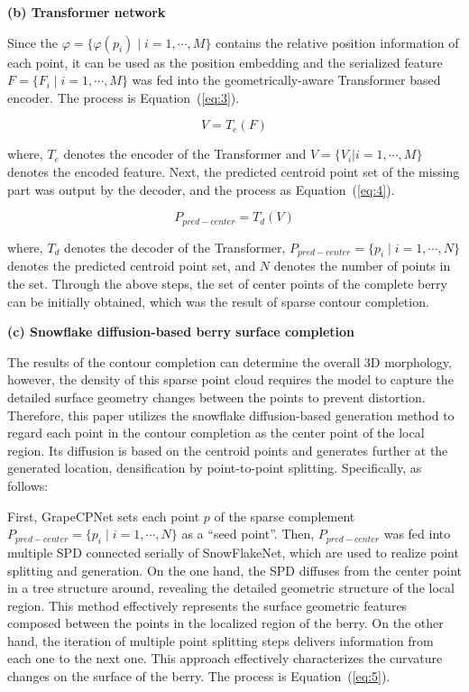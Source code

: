 \documentclass[12pt]{article}
\begin{document}
{\raggedright\textbf{(b) Transformer network}}

Since the $\varphi = \{ \varphi(p_i) \mid i=1, \cdots, M \}$ contains the relative position information of each point, it can be used as the position embedding and the serialized feature $F = \{F_i \mid i=1, \cdots, M \}$ was fed into the geometrically-aware Transformer \citep{vaswani_attention_2017} based encoder. 
The process is Equation~(\ref{eq:3}).

\begin{equation}
    V = T_e(F)
    \label{eq:3}
\end{equation}

{\raggedright where, $T_e$ denotes the encoder of the Transformer and $V=\{V_i |i=1, \cdots, M\}$ denotes the encoded feature. 
Next, the predicted centroid point set of the missing part was output by the decoder, and the process as Equation~(\ref{eq:4}).}

\begin{equation}
    P_{pred-center} = T_d(V)
    \label{eq:4}
\end{equation}

{\raggedright where, $T_d$ denotes the decoder of the Transformer, $P_{pred-center}=\{p_i \mid i=1,\cdots,N\}$ denotes the predicted centroid point set, and $N$ denotes the number of points in the set. 
Through the above steps, the set of center points of the complete berry can be initially obtained, which was the result of sparse contour completion.}

{\raggedright\textbf{(c) Snowflake diffusion-based berry surface completion}}

The results of the contour completion can determine the overall 3D morphology, however, the density of this sparse point cloud requires the model to capture the detailed surface geometry changes between the points to prevent distortion. 
Therefore, this paper utilizes the snowflake diffusion-based generation method to regard each point in the contour completion as the center point of the local region. 
Its diffusion is based on the centroid points and generates further at the generated location, densification by point-to-point splitting. 
Specifically, as follows:

First, GrapeCPNet sets each point $p$ of the sparse complement $P_{pred-center}=\{p_i \mid i=1,\cdots,N\}$ as a ``seed point''. 
Then, $P_{pred-center}$ was fed into multiple SPD \citep{xiang_snowflakenet_2021} connected serially of SnowFlakeNet, which are used to realize point splitting and generation. 
On the one hand, the SPD diffuses from the center point in a tree structure around, revealing the detailed geometric structure of the local region. 
This method effectively represents the surface geometric features composed between the points in the localized region of the berry. 
On the other hand, the iteration of multiple point splitting steps delivers information from each one to the next one. 
This approach effectively characterizes the curvature changes on the surface of the berry. The process is Equation~(\ref{eq:5}).
\end{document}
